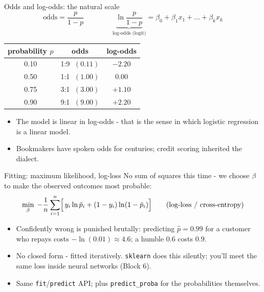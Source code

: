 \documentclass[10pt,aspectratio=169]{beamer}
\begin{document}
\begin{frame}{Odds and log-odds: the natural scale}
  \[
    \text{odds} = \frac{p}{1-p}
    \qquad\qquad
    \underbrace{\ln\frac{p}{1-p}}_{\text{log-odds (logit)}}
    = \beta_0 + \beta_1 x_1 + \dots + \beta_k x_k
  \]
  \vspace{0.2em}
  \begin{center}\small
  \begin{tabular}{@{}ccc@{}}
    \toprule
    probability $p$ & odds & log-odds \\
    \midrule
    0.10 & 1:9 $\;(0.11)$ & $-2.20$ \\
    0.50 & 1:1 $\;(1.00)$ & $0.00$ \\
    0.75 & 3:1 $\;(3.00)$ & $+1.10$ \\
    0.90 & 9:1 $\;(9.00)$ & $+2.20$ \\
    \bottomrule
  \end{tabular}
  \end{center}
  \vspace{0.3em}
  \begin{itemize}\small
    \item The model is \alert{linear in log-odds} - that is the sense in
          which logistic regression is a linear model.
    \item Bookmakers have spoken odds for centuries; credit scoring inherited
          the dialect.
  \end{itemize}
\end{frame}

\begin{frame}{Fitting: maximum likelihood, log-loss}
  No sum of squares this time - we choose $\beta$ to make the observed
  outcomes most probable:
  \[
    \min_{\beta}\;
    -\frac{1}{n}\sum_{i=1}^{n}\Bigl[\, y_i \ln \hat{p}_i
    + (1-y_i)\ln(1-\hat{p}_i) \Bigr]
    \qquad \text{(log-loss / cross-entropy)}
  \]
  \begin{itemize}\small
    \item Confidently wrong is punished brutally: predicting $\hat{p}=0.99$
          for a customer who repays costs $-\ln(0.01) \approx 4.6$; a humble
          $0.6$ costs $0.9$.
    \item No closed form - fitted iteratively. \texttt{sklearn} does this
          silently; you'll meet the same loss inside neural networks (Block 6).
    \item Same \texttt{fit}/\texttt{predict} API; plus
          \texttt{predict\_proba} for the probabilities themselves.
  \end{itemize}
\end{frame}
\end{document}
